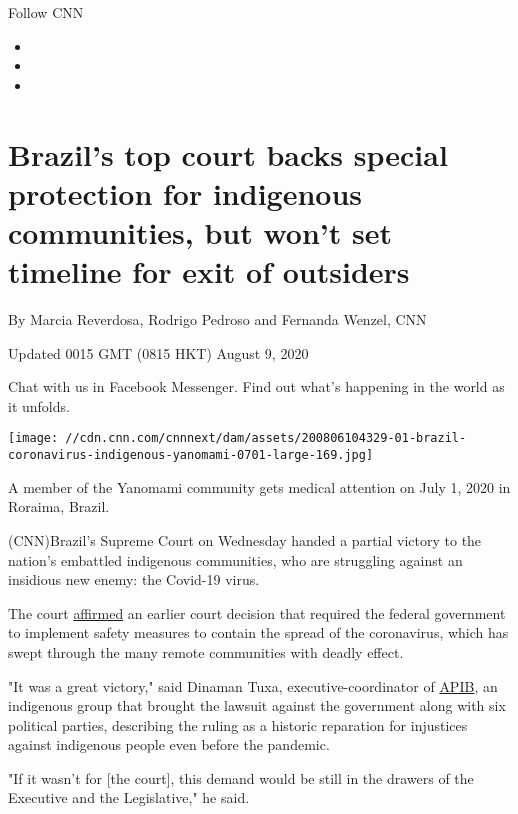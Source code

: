 Follow CNN

\begin{itemize}
\item
\item
\item
\end{itemize}

\hypertarget{brazils-top-court-backs-special-protection-for-indigenous-communities-but-wont-set-timeline-for-exit-of-outsiders}{%
\section{Brazil's top court backs special protection for indigenous
communities, but won't set timeline for exit of
outsiders}\label{brazils-top-court-backs-special-protection-for-indigenous-communities-but-wont-set-timeline-for-exit-of-outsiders}}

By Marcia Reverdosa, Rodrigo Pedroso and Fernanda Wenzel, CNN

Updated 0015 GMT (0815 HKT) August 9, 2020

Chat with us in Facebook Messenger. Find out what's happening in the
world as it unfolds.

\texttt{[image: //cdn.cnn.com/cnnnext/dam/assets/200806104329-01-brazil-coronavirus-indigenous-yanomami-0701-large-169.jpg]}

A member of the Yanomami community gets medical attention on July 1,
2020 in Roraima, Brazil.

(CNN)Brazil's Supreme Court on Wednesday handed a partial victory to the
nation's embattled indigenous communities, who are struggling against an
insidious new enemy: the Covid-19 virus.

The court
\href{http://stf.jus.br/portal/cms/verNoticiaDetalhe.asp?idConteudo=448997}{affirmed}
an earlier court decision that required the federal government to
implement safety measures to contain the spread of the coronavirus,
which has swept through the many remote communities with deadly effect.

"It was a great victory," said Dinaman Tuxa, executive-coordinator of
\href{http://apib.info/apib/?lang=en}{APIB}, an indigenous group that
brought the lawsuit against the government along with six political
parties, describing the ruling as a historic reparation for injustices
against indigenous people even before the pandemic.

"If it wasn't for {[}the court{]}, this demand would be still in the
drawers of the Executive and the Legislative," he said.

